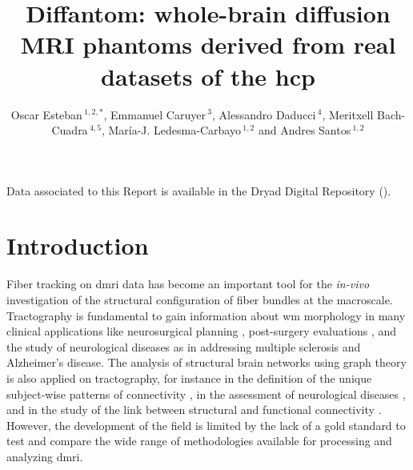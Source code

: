 \documentclass[english]{frontiers/frontiersSCNS} %
\def\firstAuthorLast{Esteban {et~al.}} %
\def\Authors{Oscar Esteban\,$^{1,2,*}$, Emmanuel Caruyer\,$^{3}$, Alessandro Daducci\,$^{4}$, Meritxell Bach-Cuadra\,$^{4,5}$,%
Mar\'ia-J. Ledesma-Carbayo\,$^{1,2}$ and Andres Santos\,$^{1,2}$}
\begin{document}
\onecolumn
{}

\title[Diffantom]{Diffantom: whole-brain diffusion MRI phantoms derived from real datasets of the \acrlong{hcp}}

\author[\firstAuthorLast ]{\Authors} %
\address{} %
\correspondance{} %

\extraAuth{}%


\maketitle

\begin{mdframed}[hidealllines=true, backgroundcolor=black!60, roundcorner=10pt]
{\color{white} Data associated to this Report is available in the Dryad Digital Repository ().}
\end{mdframed}

\linenumbers

\section*{Introduction}
Fiber tracking on \gls*{dmri} data has become an important tool for the \textit{in-vivo} investigation
  of the structural configuration of fiber bundles at the macroscale.
Tractography is fundamental to gain information about \gls*{wm} morphology in many clinical applications
  like neurosurgical planning \citep{golby_interactive_2011}, post-surgery evaluations \citep{toda_utility_2014},
  and the study of neurological diseases as in \citep{chua_diffusion_2008} addressing multiple sclerosis and
  Alzheimer's disease.
The analysis of structural brain networks using graph theory is also applied on tractography,
  for instance in the definition of the unique subject-wise patterns of connectivity
  \citep{sporns_human_2005}, in the assessment of neurological diseases \citep{griffa_structural_2013}, and in the
  study of the link between structural and functional connectivity \citep{messe_predicting_2015}.
However, the development of the field is limited by the lack of a gold standard to test and compare the
  wide range of methodologies available for processing and analyzing \gls*{dmri}.
\end{document}
